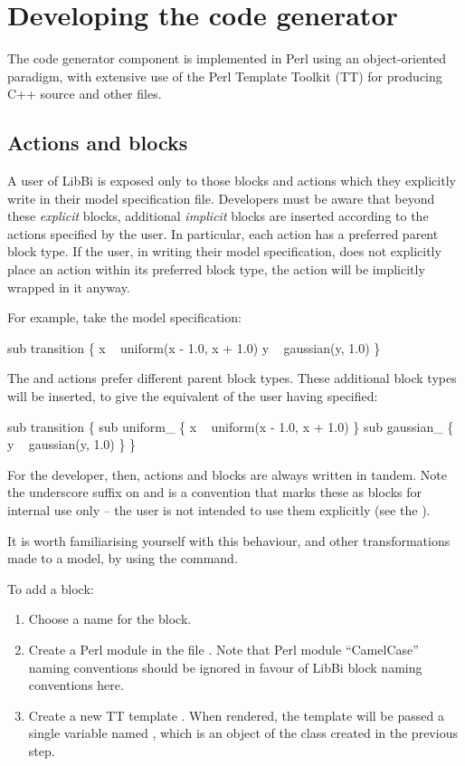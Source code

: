 \section{Developing the code generator}

The code generator component is implemented in Perl using an object-oriented
paradigm, with extensive use of the Perl Template Toolkit (TT) for producing
C++ source and other files.

\subsection{Actions and blocks}

A user of LibBi is exposed only to those blocks and actions which they
explicitly write in their model specification file. Developers must be aware
that beyond these \textit{explicit} blocks, additional \textit{implicit}
blocks are inserted according to the actions specified by the user. In
particular, each action has a preferred parent block type. If the user, in
writing their model specification, does not explicitly place an action within
its preferred block type, the action will be implicitly wrapped in it anyway.

For example, take the model specification:
\begin{bicode}
sub transition \{
  x ~ uniform(x - 1.0, x + 1.0)
  y ~ gaussian(y, 1.0)
\}
\end{bicode}
The  and  actions prefer different
parent block types. These additional block types will be inserted, to give the
equivalent of the user having specified:
\begin{bicode}
sub transition \{
  sub uniform_ \{
    x ~ uniform(x - 1.0, x + 1.0)
  \}
  sub gaussian_ \{
    y ~ gaussian(y, 1.0)
  \}
\}
\end{bicode}

For the developer, then, actions and blocks are always written in tandem.
Note the underscore suffix on  and  is a
convention that marks these as blocks for internal use only -- the user is not
intended to use them explicitly (see the ).

It is worth familiarising yourself with this behaviour, and other
transformations made to a model, by using the  command.

To add a block:
\begin{enumerate}
\item Choose a name for the block.
\item Create a Perl module  in the
  file . Note that Perl module
  ``CamelCase'' naming conventions should be ignored in favour of LibBi block
  naming conventions here.
\item Create a new TT template
  . When rendered, the template
  will be passed a single variable named , which is an object of
  the class created in the previous step.
\end{enumerate}

